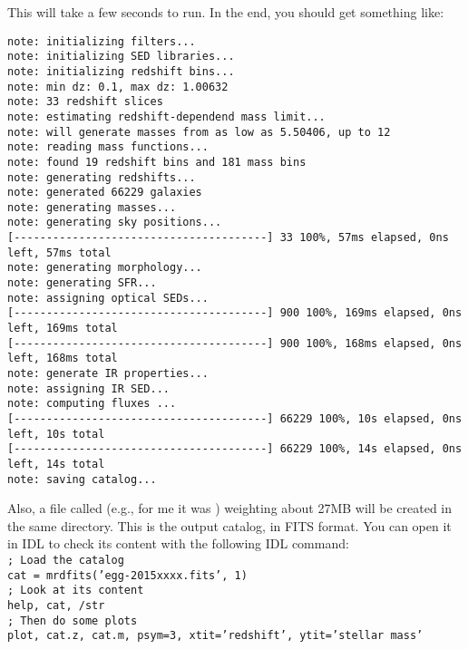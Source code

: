 This will take a few seconds to run. In the end, you should get something like:
\begin{verbatim}
note: initializing filters...
note: initializing SED libraries...
note: initializing redshift bins...
note: min dz: 0.1, max dz: 1.00632
note: 33 redshift slices
note: estimating redshift-dependend mass limit...
note: will generate masses from as low as 5.50406, up to 12
note: reading mass functions...
note: found 19 redshift bins and 181 mass bins
note: generating redshifts...
note: generated 66229 galaxies
note: generating masses...
note: generating sky positions...
[---------------------------------------] 33 100%, 57ms elapsed, 0ns left, 57ms total
note: generating morphology...
note: generating SFR...
note: assigning optical SEDs...
[---------------------------------------] 900 100%, 169ms elapsed, 0ns left, 169ms total
[---------------------------------------] 900 100%, 168ms elapsed, 0ns left, 168ms total
note: generate IR properties...
note: assigning IR SED...
note: computing fluxes ...
[---------------------------------------] 66229 100%, 10s elapsed, 0ns left, 10s total
[---------------------------------------] 66229 100%, 14s elapsed, 0ns left, 14s total
note: saving catalog...
\end{verbatim}

Also, a file called  (e.g., for me it was ) weighting about 27MB will be created in the same directory. This is the output catalog, in FITS format. You can open it in IDL to check its content with the following IDL command: \\[0.5cm]
\noindent \texttt{\color{gray}; Load the catalog} \\
\noindent \texttt{cat = mrdfits({\color{DodgerBlue}'egg-2015xxxx.fits'}, {\color{red}1})} \\
\noindent \texttt{\color{gray}; Look at its content} \\
\noindent \texttt{{\color{Green}help}, cat, /str} \\
\noindent \texttt{\color{gray}; Then do some plots} \\
\noindent \texttt{{\color{Green}plot}, cat.z, cat.m, psym={\color{red}3}, xtit={\color{DodgerBlue}'redshift'}, ytit={\color{DodgerBlue}'stellar mass'}} \\

